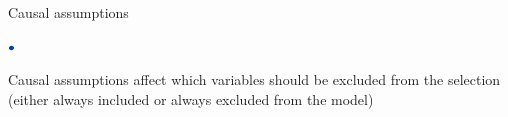 \documentclass[english,t]{beamer}
\newenvironment{list1}{
   \begin{list}{$\color{list1}\bullet$}{\itemsep=6pt}}{
  \end{list}}
\begin{document}
\begin{frame}{Causal assumptions}

  \begin{list1}
  \item Causal assumptions affect which variables should be excluded
    from the selection (either always included or always excluded from
    the model)
  \end{list1}

  
\end{frame}


  
\end{document}
